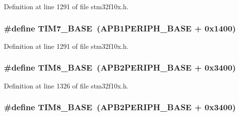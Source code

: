 Definition at line 1291 of file stm32f10x.\+h.

\subsubsection[{\texorpdfstring{T\+I\+M7\+\_\+\+B\+A\+SE}{TIM7_BASE}}]{\setlength{\rightskip}{0pt plus 5cm}\#define T\+I\+M7\+\_\+\+B\+A\+SE~({\bf A\+P\+B1\+P\+E\+R\+I\+P\+H\+\_\+\+B\+A\+SE} + 0x1400)}\hypertarget{group___peripheral__memory__map_ga0ebf54364c6a2be6eb19ded6b18b6387}{}\label{group___peripheral__memory__map_ga0ebf54364c6a2be6eb19ded6b18b6387}


Definition at line 1291 of file stm32f10x.\+h.

\subsubsection[{\texorpdfstring{T\+I\+M8\+\_\+\+B\+A\+SE}{TIM8_BASE}}]{\setlength{\rightskip}{0pt plus 5cm}\#define T\+I\+M8\+\_\+\+B\+A\+SE~({\bf A\+P\+B2\+P\+E\+R\+I\+P\+H\+\_\+\+B\+A\+SE} + 0x3400)}\hypertarget{group___peripheral__memory__map_ga5b72f698b7a048a6f9fcfe2efe5bc1db}{}\label{group___peripheral__memory__map_ga5b72f698b7a048a6f9fcfe2efe5bc1db}


Definition at line 1326 of file stm32f10x.\+h.

\subsubsection[{\texorpdfstring{T\+I\+M8\+\_\+\+B\+A\+SE}{TIM8_BASE}}]{\setlength{\rightskip}{0pt plus 5cm}\#define T\+I\+M8\+\_\+\+B\+A\+SE~({\bf A\+P\+B2\+P\+E\+R\+I\+P\+H\+\_\+\+B\+A\+SE} + 0x3400)}\hypertarget{group___peripheral__memory__map_ga5b72f698b7a048a6f9fcfe2efe5bc1db}{}\label{group___peripheral__memory__map_ga5b72f698b7a048a6f9fcfe2efe5bc1db}


